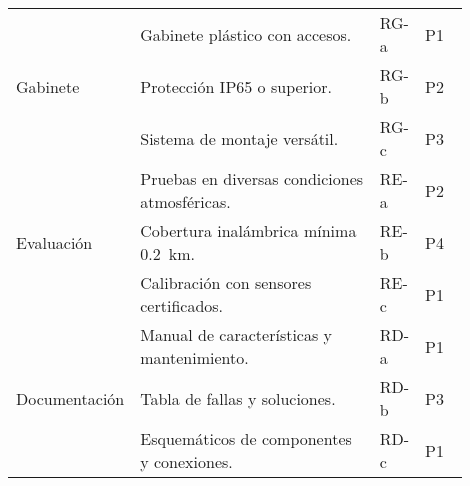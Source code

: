 \begin{tabular}{p{0.15\linewidth}p{0.55\linewidth}p{0.1\linewidth}p{0.1\linewidth}}
		\midrule
		\multirow{3}{*}{Gabinete} 
		& Gabinete plástico con accesos. & RG-a & P1 \\
		& Protección IP65 o superior. & RG-b & P2 \\
		& Sistema de montaje versátil. & RG-c & P3 \\
		\midrule
		\multirow{3}{*}{Evaluación} 
		& Pruebas en diversas condiciones atmosféricas. & RE-a & P2 \\
		& Cobertura inalámbrica mínima \SI{0.2}{\kilo\meter}. & RE-b & P4 \\
		& Calibración con sensores certificados. & RE-c & P1 \\
		\midrule
		\multirow{3}{*}{Documentación} 
		& Manual de características y mantenimiento. & RD-a & P1 \\
		& Tabla de fallas y soluciones. & RD-b & P3 \\
		& Esquemáticos de componentes y conexiones. & RD-c & P1 \\
		\bottomrule
	\end{tabular}